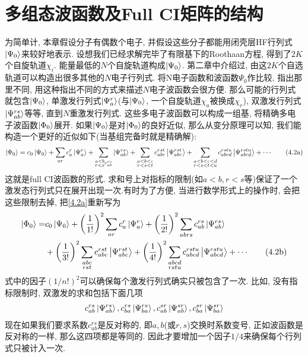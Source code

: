 \section{多组态波函数及Full CI矩阵的结构}
为简单计, 本章假设分子有偶数个电子, 并假设这些分子都能用闭壳层HF行列式$\Ket{\Psi_0}$来较好地表示. 设想我们已经求解完毕了有限基下的Roothaan方程, 得到了$2K$个自旋轨道${\chi_i}$. 能量最低的$N$个自旋轨道构成$\Ket{\Psi_0}$. 第二章中介绍过, 由这$2K$个自选轨道可以构造出很多其他的$N$电子行列式. 将N电子函数和\hft 波函数$\Psi_0$作比较, 指出那里不同, 用这种指出不同的方式来描述$N$电子波函数会很方便. 那么可能的行列式就包含$\Ket{\Psi_0}$, 单激发行列式$\Ket{\Psi_a^r}$(与$\Ket{\Psi_0}$, 一个自旋轨道$\chi_a$被换成$\chi_r$), 双激发行列式$\Ket{\Psi_{ab}^{rs}}$等等, 直到$N$重激发行列式. 这些多电子波函数可以构成一组基, 将精确多电子波函数$\Ket{\Phi_0}$展开. 如果$\Ket{\Psi_0}$是对$\Ket{\Phi_0}$的良好近似, 那么从变分原理可以知, 我们能构造一个更好的近似如下(当基组完备时就是精确解):
\begin{align}
\Ket{\Phi_0} = c_0\Ket{\Psi_0}+\sum_{ar}c_a^r\Ket{\Psi_{a}^r} + \sum_{\substack{a<b\\r<s}c_{ab}^{rs}}\Ket{\Psi_{ab}^{rs}} + \sum_{\substack{a<b<c\\r<s<t}}c_{abc}^{rst}\Ket{\Psi_{abc}^{rst}}+ \sum_{\substack{a<b<c<d\\r<s<t<u}}c_{abcd}^{rstu}\Ket{\Psi_{abcd}^{rstu}} + \cdots \tag{4.2a}
\label{4.2a}
\end{align}
这就是full CI波函数的形式. 求和号上对指标的限制(如$a<b, r<s$等)保证了一个激发态行列式只在展开出现一次.有时为了方便, 当进行数学形式上的操作时, 会把这些限制去掉, 把\eqref{4.2a}重新写为
\begin{align}
\label{4.2}
\ket{\Phi_0} =& c_0\ket{\Psi_0}+ \left( \frac{1}{1!} \right)^2\sum_{ar}c_a^r\ket{\Psi_{a}^r} + \left( \frac{1}{2!} \right)^2\sum_{\substack{abrs}}c_{ab}^{rs}\ket{\Psi_{ab}^{rs}}\notag \\
&+\left( \frac{1}{3!} \right)^2 \sum_{\substack{abc\\rst}}c_{abc}^{rst}\ket{\Psi_{abc}^{rst}}+\left( \frac{1}{4!} \right)^2 \sum_{\substack{abcd\\rstu}}c_{abcd}^{rstu}\ket{\Psi_{abcd}^{rstu}} + \cdots \tag{4.2b}
\addtocounter{equation}{1}\end{align}
式中的因子$(1/n!)^2$可以确保每个激发行列式确实只被包含了一次. 比如, 没有指标限制时, 双激发的求和包括下面几项
\begin{align*}
c_{ab}^{rs}\Ket{\Psi_{ab}^{rs}}, 
c_{ba}^{rs}\Ket{\Psi_{ba}^{rs}}, 
c_{ab}^{sr}\Ket{\Psi_{ab}^{sr}},
c_{ba}^{sr}\Ket{\Psi_{ba}^{sr}}
\end{align*}
现在如果我们要求系数$c_{ab}^{rs}$是反对称的, 即$a,b$(或$r,s$)交换时系数变号, 正如波函数是反对称的一样, 那么这四项都是等同的. 因此才要增加一个因子$1/4$来确保每个行列式只被计入一次.

